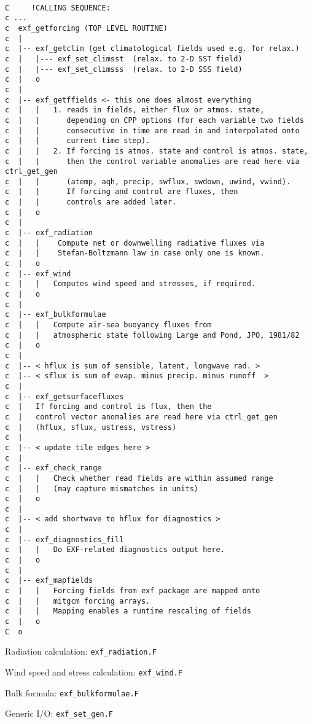 {\footnotesize
\begin{verbatim}

C     !CALLING SEQUENCE:
c ...
c  exf_getforcing (TOP LEVEL ROUTINE)
c  |
c  |-- exf_getclim (get climatological fields used e.g. for relax.)
c  |   |--- exf_set_climsst  (relax. to 2-D SST field)
c  |   |--- exf_set_climsss  (relax. to 2-D SSS field)
c  |   o
c  |
c  |-- exf_getffields <- this one does almost everything
c  |   |   1. reads in fields, either flux or atmos. state,
c  |   |      depending on CPP options (for each variable two fields
c  |   |      consecutive in time are read in and interpolated onto
c  |   |      current time step).
c  |   |   2. If forcing is atmos. state and control is atmos. state,
c  |   |      then the control variable anomalies are read here via ctrl_get_gen
c  |   |      (atemp, aqh, precip, swflux, swdown, uwind, vwind).
c  |   |      If forcing and control are fluxes, then
c  |   |      controls are added later.
c  |   o
c  |
c  |-- exf_radiation
c  |   |    Compute net or downwelling radiative fluxes via
c  |   |    Stefan-Boltzmann law in case only one is known.
c  |   o
c  |-- exf_wind
c  |   |   Computes wind speed and stresses, if required.
c  |   o
c  |
c  |-- exf_bulkformulae
c  |   |   Compute air-sea buoyancy fluxes from
c  |   |   atmospheric state following Large and Pond, JPO, 1981/82
c  |   o
c  |
c  |-- < hflux is sum of sensible, latent, longwave rad. >
c  |-- < sflux is sum of evap. minus precip. minus runoff  >
c  |
c  |-- exf_getsurfacefluxes
c  |   If forcing and control is flux, then the
c  |   control vector anomalies are read here via ctrl_get_gen
c  |   (hflux, sflux, ustress, vstress)
c  |
c  |-- < update tile edges here >
c  |
c  |-- exf_check_range
c  |   |   Check whether read fields are within assumed range
c  |   |   (may capture mismatches in units)
c  |   o
c  |
c  |-- < add shortwave to hflux for diagnostics >
c  |
c  |-- exf_diagnostics_fill
c  |   |   Do EXF-related diagnostics output here.
c  |   o
c  |
c  |-- exf_mapfields
c  |   |   Forcing fields from exf package are mapped onto
c  |   |   mitgcm forcing arrays.
c  |   |   Mapping enables a runtime rescaling of fields
c  |   o
C  o
\end{verbatim}
}

Radiation calculation: \texttt{exf\_radiation.F}

Wind speed and stress calculation: \texttt{exf\_wind.F}

Bulk formula: \texttt{exf\_bulkformulae.F}

Generic I/O: \texttt{exf\_set\_gen.F}

